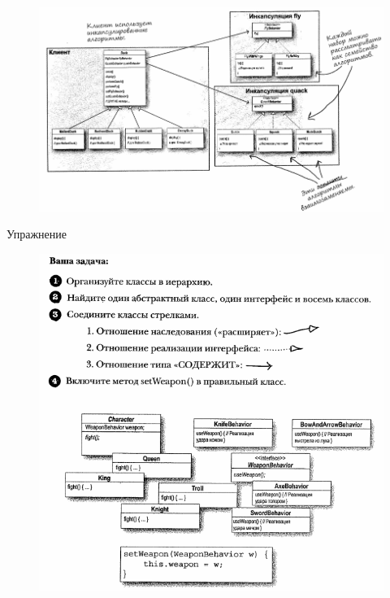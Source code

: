 \documentclass{beamer}
\begin{document}
\begin{frame}
\begin{figure}[h]
\centering
\includegraphics[scale=0.5]{images/lec09-pic16.png}
\label{pic-sort}
\end{figure}
\end{frame}

\begin{frame}{Упражнение}
\begin{figure}[h]
\centering
\includegraphics[scale=0.5]{images/lec09-pic18.png}
\label{pic-sort}
\end{figure}
\end{frame}
\end{document}
